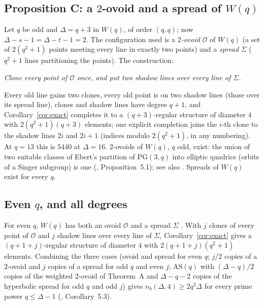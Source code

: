 \documentclass[11pt]{amsart}
\theoremstyle{definition}
\theoremstyle{remark}
\newcommand{\cO}{\mathcal{O}}
\begin{document}
\subsection{Proposition C: a \texorpdfstring{$2$}{2}-ovoid and a spread of \texorpdfstring{$W(q)$}{W(q)}}\label{ssec:C}
Let $q$ be odd and $\Delta=q+3$ in $W(q)$, of order $(q,q)$; now $\Delta-s-1=\Delta-t-1=2$. The configuration used is a \emph{$2$-ovoid} $\cO$ of $W(q)$ (a set of $2(q^2+1)$ points meeting every line in exactly two points) and a \emph{spread} $\Sigma$ ($q^2+1$ lines partitioning the points). The construction:
\begin{center}
\emph{Clone every point of $\cO$ once, and put two shadow lines over every line of $\Sigma$.}
\end{center}
Every old line gains two clones, every old point is on two shadow lines (those over its spread line), clones and shadow lines have degree $q+1$, and Corollary~\ref{cor:exact} completes it to a $(q+3)$-regular structure of diameter $4$ with $2(q^2+1)(q+3)$ elements; one explicit completion joins the $i$-th clone to the shadow lines $2i$ and $2i+1$ (indices modulo $2(q^2+1)$, in any numbering). At $q=13$ this is $5440$ at $\Delta=16$. $2$-ovoids of $W(q)$, $q$ odd, exist: the union of two suitable classes of Ebert's partition of $\mathrm{PG}(3,q)$ into elliptic quadrics (orbits of a Singer subgroup) is one (, Proposition~5.1); see also \cite{BLP09}. Spreads of $W(q)$ exist for every $q$.

\subsection{Even \texorpdfstring{$q$}{q}, and all degrees}\label{ssec:even4}
For even $q$, $W(q)$ has both an ovoid $\cO$ and a spread $\Sigma$ \cite{PT}. With $j$ clones of every point of $\cO$ and $j$ shadow lines over every line of $\Sigma$, Corollary~\ref{cor:exact} gives a $(q+1+j)$-regular structure of diameter $4$ with $2(q+1+j)(q^2+1)$ elements. Combining the three cases (ovoid and spread for even $q$; $j/2$ copies of a $2$-ovoid and $j$ copies of a spread for odd $q$ and even $j$; $\mathrm{AS}(q)$ with $(\Delta-q)/2$ copies of the weighted $2$-ovoid of Theorem~A and $\Delta-q-2$ copies of the hyperbolic spread for odd $q$ and odd $j$) gives $n_b(\Delta,4)\ge 2q^2\Delta$ for every prime power $q\le\Delta-1$ (, Corollary~5.3).
\end{document}
